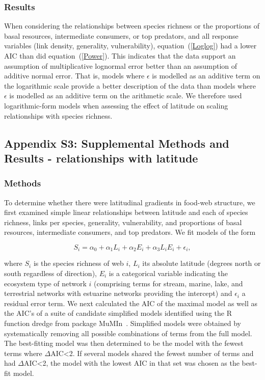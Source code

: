 \documentclass[12pt]{article}
\begin{document}
  \subsubsection*{Results}

    When considering the relationships between species richness or the proportions 
    of basal resources, intermediate consumers, or top predators, and all response variables 
    (link density, generality, vulnerability), equation~(\ref{Loglog}) had a
    lower AIC than did equation~(\ref{Power}). This indicates that the
    data support an assumption of multiplicative lognormal error better than an
    assumption of additive normal error. That is, models where $\epsilon$ is
    modelled as an additive term on
    the logarithmic scale provide a better description of the data than models
    where $\epsilon$ is modelled as an additive term on the arithmetic scale.  
    We therefore used logarithmic-form models when assessing the
    effect of latitude on scaling relationships  with species richness.

\subsection*{Appendix S3: Supplemental Methods and Results - relationships with latitude}

  \subsubsection*{Methods}

    To determine whether there were latitudinal gradients in food-web structure,
    we first examined simple linear relationships between latitude and each of 
    species richness, links per species, generality, vulnerability, and proportions
    of basal resources, intermediate consumers, and top predators. We fit models of the form

    \begin{equation}
    \label{Latfull}
    S_{i} = \alpha_{0} + \alpha_{1} L_{i} + \alpha_{2} E_{i} + \alpha_{3} L_{i} E_{i} + \epsilon_{i} ,
    \end{equation}

    \noindent where $S_{i}$ is the species richness of web $i$, $L_{i}$ its absolute
    latitude (degrees north or south  regardless of direction), $E_{i}$ is a categorical
    variable indicating the ecosystem type of network $i$ (comprising terms for stream, 
    marine, lake, and terrestrial networks with estuarine
    networks providing the intercept) and $\epsilon_{i}$ a residual error term. 
    We next calculated the AIC
    of the maximal model as well as the AIC's of a suite of candidate simplified models identified
    using the R~\citep{R} function dredge from package MuMIn~\citep{MuMIn}. 
    Simplified models were obtained by
    systematically removing all possible combinations of terms from the full model.
    The best-fitting model was then determined to be the model with the fewest terms 
    where $\Delta$AIC\textless2. If several models shared the fewest number of terms 
    and had $\Delta$AIC\textless2, the model with the lowest AIC in that set was chosen as the best-fit
    model.
\end{document}
